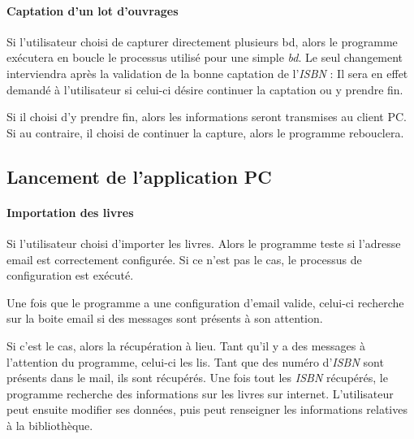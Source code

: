 \paragraph{Captation d'un lot d'ouvrages}
Si l'utilisateur choisi de capturer directement plusieurs bd, alors le programme exécutera en boucle le processus utilisé pour une simple \emph{bd}. 
Le seul changement interviendra après la validation de la bonne captation de l'\emph{ISBN} :
Il sera en effet demandé à l'utilisateur si celui-ci désire continuer la captation ou y prendre fin. 

Si il choisi d'y prendre fin, alors les informations seront transmises au client PC. 
Si au contraire, il choisi de continuer la capture, alors le programme rebouclera. 


\subsection{Lancement de l'application PC}

\paragraph{Importation des livres}
Si l'utilisateur choisi d'importer les livres. Alors le programme teste si l'adresse email est correctement configurée. Si ce n'est pas le cas, le processus de configuration est exécuté. 

Une fois que le programme a une configuration d'email valide, celui-ci recherche sur la boite email si des messages sont présents à son attention. 

Si c'est le cas, alors la récupération à lieu. 
Tant qu'il y a des messages à l'attention du programme, celui-ci les lis. 
Tant que des numéro d'\emph{ISBN} sont présents dans le mail, ils sont récupérés. 
Une fois tout les \emph{ISBN} récupérés, le programme recherche des informations sur les livres sur internet.
L'utilisateur peut ensuite modifier ses données, puis peut renseigner les informations relatives à la bibliothèque. 

